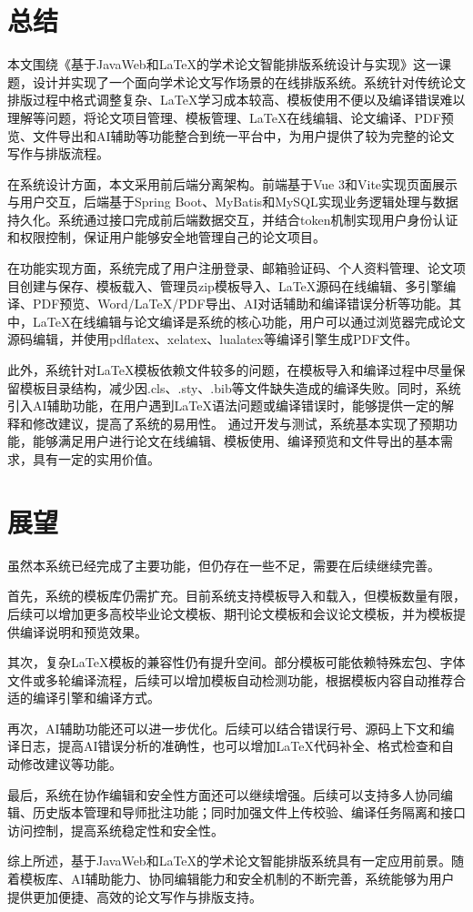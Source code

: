 \documentclass[twoside,openright]{xduugthesis}
\begin{document}
\section{总结}
本文围绕《基于JavaWeb和LaTeX的学术论文智能排版系统设计与实现》这一课题，设计并实现了一个面向学术论文写作场景的在线排版系统。系统针对传统论文排版过程中格式调整复杂、LaTeX学习成本较高、模板使用不便以及编译错误难以理解等问题，将论文项目管理、模板管理、LaTeX在线编辑、论文编译、PDF预览、文件导出和AI辅助等功能整合到统一平台中，为用户提供了较为完整的论文写作与排版流程。

在系统设计方面，本文采用前后端分离架构。前端基于Vue 3和Vite实现页面展示与用户交互，后端基于Spring Boot、MyBatis和MySQL实现业务逻辑处理与数据持久化。系统通过接口完成前后端数据交互，并结合token机制实现用户身份认证和权限控制，保证用户能够安全地管理自己的论文项目。

在功能实现方面，系统完成了用户注册登录、邮箱验证码、个人资料管理、论文项目创建与保存、模板载入、管理员zip模板导入、LaTeX源码在线编辑、多引擎编译、PDF预览、Word/LaTeX/PDF导出、AI对话辅助和编译错误分析等功能。其中，LaTeX在线编辑与论文编译是系统的核心功能，用户可以通过浏览器完成论文源码编辑，并使用pdflatex、xelatex、lualatex等编译引擎生成PDF文件。

此外，系统针对LaTeX模板依赖文件较多的问题，在模板导入和编译过程中尽量保留模板目录结构，减少因.cls、.sty、.bib等文件缺失造成的编译失败。同时，系统引入AI辅助功能，在用户遇到LaTeX语法问题或编译错误时，能够提供一定的解释和修改建议，提高了系统的易用性。
通过开发与测试，系统基本实现了预期功能，能够满足用户进行论文在线编辑、模板使用、编译预览和文件导出的基本需求，具有一定的实用价值。

\section{展望}
虽然本系统已经完成了主要功能，但仍存在一些不足，需要在后续继续完善。

首先，系统的模板库仍需扩充。目前系统支持模板导入和载入，但模板数量有限，后续可以增加更多高校毕业论文模板、期刊论文模板和会议论文模板，并为模板提供编译说明和预览效果。

其次，复杂LaTeX模板的兼容性仍有提升空间。部分模板可能依赖特殊宏包、字体文件或多轮编译流程，后续可以增加模板自动检测功能，根据模板内容自动推荐合适的编译引擎和编译方式。

再次，AI辅助功能还可以进一步优化。后续可以结合错误行号、源码上下文和编译日志，提高AI错误分析的准确性，也可以增加LaTeX代码补全、格式检查和自动修改建议等功能。

最后，系统在协作编辑和安全性方面还可以继续增强。后续可以支持多人协同编辑、历史版本管理和导师批注功能；同时加强文件上传校验、编译任务隔离和接口访问控制，提高系统稳定性和安全性。

综上所述，基于JavaWeb和LaTeX的学术论文智能排版系统具有一定应用前景。随着模板库、AI辅助能力、协同编辑能力和安全机制的不断完善，系统能够为用户提供更加便捷、高效的论文写作与排版支持。
\end{document}
